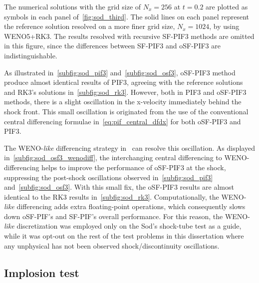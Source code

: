 The numerical solutions with the grid size of \( N_{x} = 256 \) at \( t = 0.2 \) are plotted
as symbols in each panel of~\cref{fig:sod_third}.
The solid lines on each panel represent the reference solution resolved on a more finer grid size,
\( N_{x} = 1024 \), by using WENO5+RK3.
The results resolved with recursive SF-PIF3 methods are omitted in this figure,
since the differences between SF-PIF3 and oSF-PIF3 are indistinguishable.

As illustrated in~\cref{subfig:sod_pif3} and~\cref{subfig:sod_osf3},
oSF-PIF3 method produce almost identical results of PIF3,
agreeing with the reference solutions and RK3's solutions in~\cref{subfig:sod_rk3}.
However, both in PIF3 and oSF-PIF3 methods,
there is a slight oscillation in the x-velocity immediately behind the shock front.
This small oscillation is originated from the use of
the conventional central differencing formulae in~\cref{eq:pif_central_dfdx}
for both oSF-PIF3 and PIF3.

The WENO-\textit{like} differencing strategy in~
can resolve this oscillation. As displayed in~\cref{subfig:sod_osf3_wenodiff},
the interchanging central differencing to WENO-differencing helps
to improve the performance of oSF-PIF3 at the shock,
suppressing the post-shock oscillations observed in~\cref{subfig:sod_pif3} and~\cref{subfig:sod_osf3}.
With this small fix, the oSF-PIF3 results are almost identical to the RK3 results in~\cref{subfig:sod_rk3}.
Computationally, the WENO-\textit{like} differencing adds extra floating-point operations,
which consequently slows down oSF-PIF's and SF-PIF's overall performance.
For this reason, the WENO-\textit{like} discretization was employed only
on the Sod's shock-tube test as a guide,
while it was opt-out on the rest of the test problems in this dissertation
where any unphysical has not been observed shock/discontinuity oscillations.


\subsection{Implosion test}\label{subsec:implosion}

